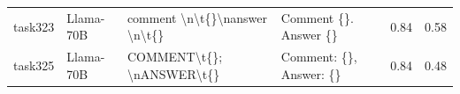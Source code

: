 \begin{longtable}{@{}p{0.8cm\tiny}p{1cm\tiny}p{4.1cm\ttfamily\tiny}p{4.1cm\ttfamily\tiny}p{0.8cm\tiny}p{0.8cm\tiny}@{}}
task323   & Llama-70B  & comment \textbackslash{}n\textbackslash{}t\{\}\textbackslash{}nanswer \textbackslash{}n\textbackslash{}t\{\}                                                                                                                                                                                                                                                                                                                                                                                                            & Comment \{\}. Answer \{\}                                                                                                                                                                                                                                                                                                                                                                                                                                                                                                                                                         & 0.84 & 0.58 \\
task325   & Llama-70B  & COMMENT\textbackslash{}t\{\}; \textbackslash{}nANSWER\textbackslash{}t\{\}                                                                                                                                                                                                                                                                                                                                                                                                                                              & Comment: \{\}, Answer: \{\}                                                                                                                                                                                                                                                                                                                                                                                                                                                                                                                                                       & 0.84 & 0.48 \\

\end{longtable}
